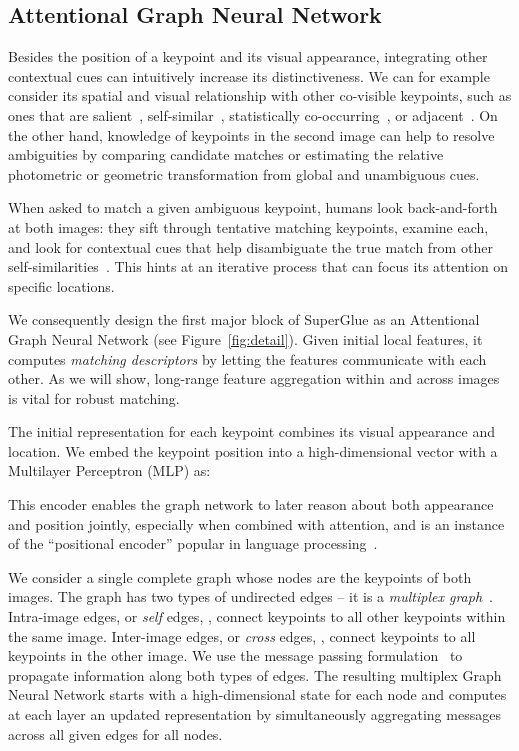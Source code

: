 \documentclass[10pt,twocolumn,letterpaper]{article}
\newcommand{\PAR}[1]{\vskip4pt \noindent{\bf #1~}}
\renewcommand{\*}[1]{\mathbf{#1}}
\newcommand{\0}{\phantom{0}}
\begin{document}
\subsection{Attentional Graph Neural Network}
\label{sec:gnn}
Besides the position of a keypoint and its visual appearance, integrating other contextual cues can intuitively increase its distinctiveness. We can for example consider its spatial and visual relationship with other co-visible keypoints, such as ones that are salient~\cite{luo2019contextdesc}, self-similar~\cite{shechtman2007matching}, statistically co-occurring~\cite{zhang2011image}, or adjacent~\cite{trzcinski2018scone}. On the other hand, knowledge of keypoints in the second image can help to resolve ambiguities by comparing candidate matches or estimating the relative photometric or geometric transformation from global and unambiguous cues.

When asked to match a given ambiguous keypoint, humans look back-and-forth at both images: they sift through tentative matching keypoints, examine each, and look for contextual cues that help disambiguate the true match from other self-similarities~\cite{chun2000contextual}. This hints at an iterative process that can focus its attention on specific locations.

We consequently design the first major block of SuperGlue as an Attentional Graph Neural Network (see Figure~\ref{fig:detail}). Given initial local features, it computes \emph{matching descriptors}  by letting the features communicate with each other. 
As we will show, long-range feature aggregation within and across images is vital for robust matching.

\PAR{Keypoint Encoder:}
The initial representation  for each keypoint  combines its visual appearance and location. We embed the keypoint position into a high-dimensional vector with a Multilayer Perceptron (MLP) as:
    
This encoder enables the graph network to later reason about both appearance and position jointly, especially when combined with attention, and is an instance of the ``positional encoder'' popular in language processing~\cite{gehring2017convolutional, vaswani2017attention}.

\PAR{Multiplex Graph Neural Network:}
We consider a single complete graph whose nodes are the keypoints of both images. The graph has two types of undirected edges -- it is a \emph{multiplex graph}~\cite{mucha2010community, nicosia2013growing}. Intra-image edges, or \emph{self} edges, , connect keypoints  to all other keypoints within the same image. Inter-image edges, or \emph{cross} edges, , connect keypoints  to all keypoints in the other image. We use the message passing formulation~\cite{gilmer2017neural, battaglia2018relational} to propagate information along both types of edges. The resulting multiplex Graph Neural Network starts with a high-dimensional state for each node and computes at each layer an updated representation by simultaneously aggregating messages across all given edges for all nodes. 
\end{document}
